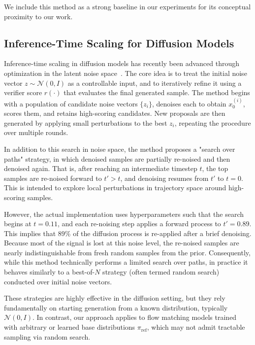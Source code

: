 \documentclass{article}
\begin{document}
We include this method as a strong baseline in our experiments for its conceptual proximity to our work.

\subsection{Inference-Time Scaling for Diffusion Models}

Inference-time scaling in diffusion models has recently been advanced through optimization in the latent noise space~\cite{ma2025diffits}. The core idea is to treat the initial noise vector \( z \sim \mathcal{N}(0, I) \) as a controllable input, and to iteratively refine it using a verifier score \( r(\cdot) \) that evaluates the final generated sample. The method begins with a population of candidate noise vectors \( \{z_i\} \), denoises each to obtain \( x_0^{(i)} \), scores them, and retains high-scoring candidates. New proposals are then generated by applying small perturbations to the best \( z_i \), repeating the procedure over multiple rounds.

In addition to this search in noise space, the method proposes a "search over paths" strategy, in which denoised samples are partially re-noised and then denoised again. That is, after reaching an intermediate timestep \( t \), the top samples are re-noised forward to \( t' > t \), and denoising resumes from \( t' \) to \( t = 0 \). This is intended to explore local perturbations in trajectory space around high-scoring samples.

However, the actual implementation uses hyperparameters such that the search begins at \( t = 0.11 \), and each re-noising step applies a forward process to \( t' = 0.89 \). This implies that 89\% of the diffusion process is re-applied after a brief denoising. Because most of the signal is lost at this noise level, the re-noised samples are nearly indistinguishable from fresh random samples from the prior. Consequently, while this method technically performs a limited search over paths, in practice it behaves similarly to a best-of-\( N \) strategy (often termed random search) conducted over initial noise vectors.

These strategies are highly effective in the diffusion setting, but they rely fundamentally on starting generation from a known distribution, typically \( \mathcal{N}(0, I) \). In contrast, our approach applies to flow matching models trained with arbitrary or learned base distributions \( \pi_{\mathrm{ref}} \), which may not admit tractable sampling via random search.
\end{document}
